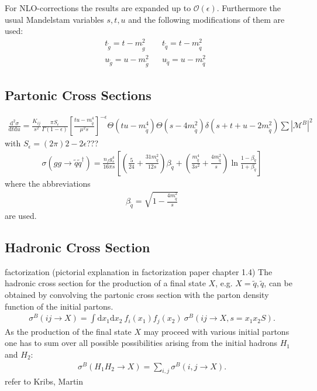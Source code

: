 For NLO-corrections the results are expanded up to $\mathcal{O}(\epsilon)$. Furthermore the usual Mandelstam variables $s,t,u$ and the following modifications of them are used:
\begin{align}
& t_{\tilde{g}} = t - m_{\tilde{g}}^2 && t_{\tilde{q}} = t- m_{\tilde{q}}^2\nonumber\\
& u_{\tilde{g}} = u - m_{\tilde{g}}^2 && u_{\tilde{q}} = u- m_{\tilde{q}}^2
\end{align}



\subsection{Partonic Cross Sections}
\begin{align}
\frac{\mbox{d}^2 \sigma}{\mbox{d}t\mbox{d}u} = \frac{K_{ij}}{s^2} \frac{\pi S_{\epsilon}}{\Gamma(1-\epsilon)} \left[ \frac{tu-m_{\tilde{q}}^4}{\mu^2 s}\right]^{-\epsilon} \Theta(tu-m_{\tilde{q}}^4) \Theta(s-4m_{\tilde{q}}^2) \delta(s+t+u-2m_{\tilde{q}}^2) \sum |\mathcal{M}^B|^2
\end{align}
with $S_\epsilon = (2\pi)2-2\epsilon$???
\begin{align}
\sigma(gg \to \tilde{q}\tilde{q}^\dagger) = \frac{n_f g_s^4}{16\pi s} \left[ \left(\frac{5}{24} + \frac{31 m_{\tilde{q}}^2}{12s}\right)\beta_{\tilde{q}} + \left( \frac{m_{\tilde{q}}^4}{3s^2} + \frac{4m_{\tilde{q}}^2}{s}\right) \ln \frac{1-\beta_{\tilde{q}}}{1+\beta_{\tilde{q}}} \right]
\end{align}
where the abbreviations 
\begin{align}
\beta_{\tilde{q}} = \sqrt{1-\frac{4 m_{\tilde{q}}^2}{s}}
\end{align}
are used.\cite{Beenakker}



\subsection{Hadronic Cross Section}
factorization (pictorial explanation in factorization paper chapter 1.4)
The hadronic cross section for the production of a final state $X$, e.g. $X = \tilde{q},\tilde{q}$, can be obtained by convolving the partonic cross section with the parton density function of the initial partons.
\begin{align}
\sigma^B(ij \to X) = \int \mbox{d}x_1 \mbox{d}x_2\ f_i(x_1) f_j(x_2)\ \sigma^B (ij \to X, s = x_ 1x_2 S).
\end{align}
As the production of the final state $X$ may proceed with various initial partons one has to sum over all possible possibilities arising from the initial hadrons $H_1$ and $H_2$:
\begin{align}
\sigma^B(H_1 H_2 \to X) = \sum_{i,j} \sigma^B(i,j \to X).
\end{align}
refer to Kribs, Martin
